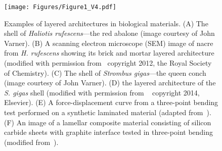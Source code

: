 \begin{figure}[ht]
\centering
\texttt{[image: Figures/Figure1\_V4.pdf]}
\caption{Examples of layered architectures in biological materials. (\textsf{A}) The shell of \textit{Haliotis rufescens}---the red abalone (image courtesy of John Varner). (\textsf{B}) A scanning electron microscope (SEM) image of nacre from \textit{H. rufescens} showing its brick and mortar layered architecture (modified with permission from~\cite{rabiei2012nacre} copyright 2012, the Royal Society of Chemistry). (\textsf{C}) The shell of \textit{Strombus gigas}---the queen conch (image courtesy of John Varner). (\textsf{D}) the layered architecture of the \textit{S. gigas} shell (modified with permission from ~\cite{osuna2014shell} copyright 2014, Elsevier). (\textsf{E}) A force-displacement curve from a three-point bending test performed on a synthetic laminated material (adapted from~\cite{clegg1990simple}). (\textsf{F}) An image of a lamellar composite material consisting of silicon carbide sheets with graphite interface tested in three-point bending (modified from~\cite{clegg1990simple}).}
\label{fig:arch}
\end{figure}
